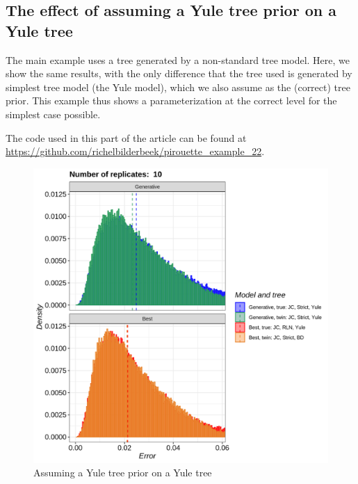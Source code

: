 \subsection{The effect of assuming a Yule tree prior on a Yule tree}
\label{subsec:simplest_correct_parameterization}

The main example uses a tree generated by a non-standard tree model.
Here, we show the same results, with the only difference that
the tree used is generated by simplest tree model (the Yule model),
which we also assume as the (correct) tree prior.
This example thus shows a parameterization at the correct level for the
simplest case possible.

The code used in this part of the article can be found at 
\url{https://github.com/richelbilderbeek/pirouette_example_22}.

\begin{figure}[H]
  \includegraphics[width=\textwidth]{pirouette_example_22/errors.png}
  \caption{Assuming a Yule tree prior on a Yule tree}
\end{figure}

